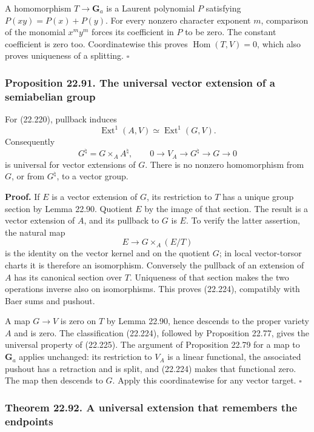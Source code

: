 \documentclass[
  11pt,
  a4paper,
]{article}
\begin{document}
A homomorphism \(T\to\mathbf G_a\) is a Laurent polynomial \(P\)
satisfying \(P(xy)=P(x)+P(y)\). For every nonzero character exponent
\(m\), comparison of the monomial \(x^my^m\) forces its coefficient in
\(P\) to be zero. The constant coefficient is zero too. Coordinatewise
this proves \(\operatorname{Hom}(T,V)=0\), which also proves uniqueness
of a splitting. \(\square\)

\subsubsection{Proposition 22.91. The universal vector extension of a
semiabelian
group}\label{proposition-22.91.-the-universal-vector-extension-of-a-semiabelian-group}

For (22.220), pullback induces \[
 \operatorname{Ext}^1(A,V)\simeq\operatorname{Ext}^1(G,V).
 \tag{22.224}
\] Consequently \[
 G^\natural=G\times_A A^\natural,\qquad
 0\longrightarrow V_A\longrightarrow G^\natural
 \longrightarrow G\longrightarrow0
 \tag{22.225}
\] is universal for vector extensions of \(G\). There is no nonzero
homomorphism from \(G\), or from \(G^\natural\), to a vector group.

\textbf{Proof.} If \(E\) is a vector extension of \(G\), its restriction
to \(T\) has a unique group section by Lemma 22.90. Quotient \(E\) by
the image of that section. The result is a vector extension of \(A\),
and its pullback to \(G\) is \(E\). To verify the latter assertion, the
natural map \[
 E\longrightarrow G\times_A(E/T)
\] is the identity on the vector kernel and on the quotient \(G\); in
local vector-torsor charts it is therefore an isomorphism. Conversely
the pullback of an extension of \(A\) has its canonical section over
\(T\). Uniqueness of that section makes the two operations inverse also
on isomorphisms. This proves (22.224), compatibly with Baer sums and
pushout.

A map \(G\to V\) is zero on \(T\) by Lemma 22.90, hence descends to the
proper variety \(A\) and is zero. The classification (22.224), followed
by Proposition 22.77, gives the universal property of (22.225). The
argument of Proposition 22.79 for a map to \(\mathbf G_a\) applies
unchanged: its restriction to \(V_A\) is a linear functional, the
associated pushout has a retraction and is split, and (22.224) makes
that functional zero. The map then descends to \(G\). Apply this
coordinatewise for any vector target. \(\square\)

\subsubsection{Theorem 22.92. A universal extension that remembers the
endpoints}\label{theorem-22.92.-a-universal-extension-that-remembers-the-endpoints}
\end{document}
